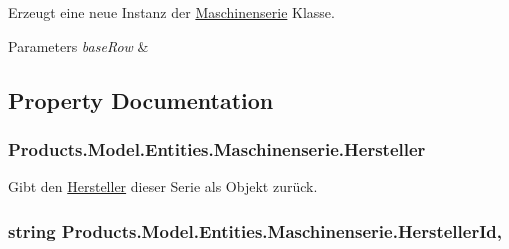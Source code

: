 Erzeugt eine neue Instanz der \hyperlink{class_products_1_1_model_1_1_entities_1_1_maschinenserie}{Maschinenserie} Klasse. 


\begin{DoxyParams}{Parameters}
{\em base\+Row} & \\
\hline
\end{DoxyParams}


\subsection{Property Documentation}
\subsubsection[{\texorpdfstring{Hersteller}{Hersteller}}]{ Products.\+Model.\+Entities.\+Maschinenserie.\+Hersteller\hspace{0.3cm}{\ttfamily [get]}}\hypertarget{class_products_1_1_model_1_1_entities_1_1_maschinenserie_a7d51a91c6227ccd37658b96344e3d197}{}\label{class_products_1_1_model_1_1_entities_1_1_maschinenserie_a7d51a91c6227ccd37658b96344e3d197}


Gibt den \hyperlink{class_products_1_1_model_1_1_entities_1_1_hersteller}{Hersteller} dieser Serie als Objekt zurück. 

\subsubsection[{\texorpdfstring{Hersteller\+Id}{HerstellerId}}]{\setlength{\rightskip}{0pt plus 5cm}string Products.\+Model.\+Entities.\+Maschinenserie.\+Hersteller\+Id\hspace{0.3cm}{\ttfamily [get]}, {\ttfamily [set]}}\hypertarget{class_products_1_1_model_1_1_entities_1_1_maschinenserie_ad38ca70da9e89a7daae0088e76b93aba}{}\label{class_products_1_1_model_1_1_entities_1_1_maschinenserie_ad38ca70da9e89a7daae0088e76b93aba}


